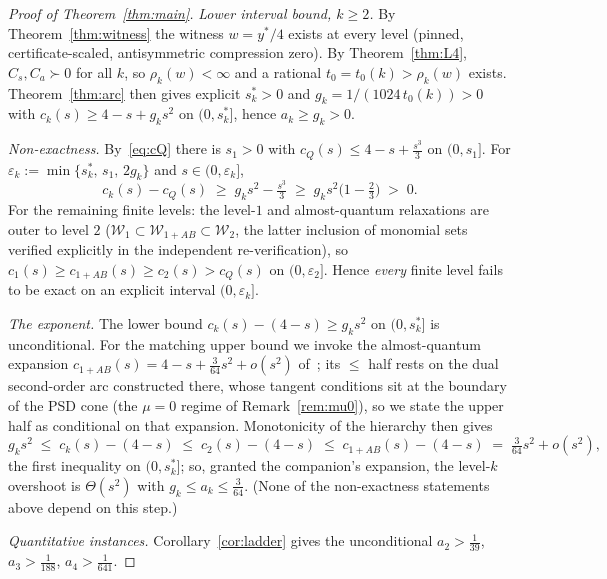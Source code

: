 \documentclass[11pt]{article}
\newcommand{\eps}{\varepsilon}
\begin{document}
\begin{proof}[Proof of Theorem~\ref{thm:main}]
\emph{Lower interval bound, $k\ge2$.} By Theorem~\ref{thm:witness} the
witness $w=y^\ast/4$ exists at every level (pinned, certificate-scaled,
antisymmetric compression zero). By Theorem~\ref{thm:L4}, $C_s,C_a\succ0$
for all $k$, so $\rho_k(w)<\infty$ and a rational $t_0=t_0(k)>\rho_k(w)$
exists. Theorem~\ref{thm:arc} then gives explicit $s^\ast_k>0$ and
$g_k=1/(1024\,t_0(k))>0$ with $c_k(s)\ge4-s+g_ks^2$ on $(0,s^\ast_k]$,
hence $a_k\ge g_k>0$.

\emph{Non-exactness.} By~\eqref{eq:cQ} there is $s_1>0$ with
$c_Q(s)\le4-s+\tfrac{s^3}3$ on $(0,s_1]$. For
$\eps_k:=\min\{s^\ast_k,\,s_1,\,2g_k\}$ and $s\in(0,\eps_k]$,
\[
c_k(s)-c_Q(s)\;\ge\;g_ks^2-\tfrac{s^3}3\;\ge\;g_ks^2\bigl(1-\tfrac23\bigr)
\;>\;0 .
\]
For the remaining finite levels: the level-$1$ and almost-quantum
relaxations are outer to level $2$
($\mathcal W_1\subset\mathcal W_{1+AB}\subset\mathcal W_2$, the latter
inclusion of monomial sets verified explicitly in the independent
re-verification), so
$c_1(s)\ge c_{1+AB}(s)\ge c_2(s)>c_Q(s)$ on $(0,\eps_2]$. Hence
\emph{every} finite level fails to be exact on an explicit interval
$(0,\eps_k]$.

\emph{The exponent.} The lower bound $c_k(s)-(4-s)\ge g_ks^2$ on
$(0,s^\ast_k]$ is unconditional. For the matching upper bound we invoke the
almost-quantum expansion $c_{1+AB}(s)=4-s+\tfrac3{64}s^2+o(s^2)$
of~\cite{overshoot}; its $\le$ half rests on the dual second-order arc
constructed there, whose tangent conditions sit at the boundary of the PSD
cone (the $\mu=0$ regime of Remark~\ref{rem:mu0}), so we state the upper
half as conditional on that expansion. Monotonicity of the hierarchy then
gives
\[
g_ks^2\;\le\;c_k(s)-(4-s)\;\le\;c_2(s)-(4-s)\;\le\;
c_{1+AB}(s)-(4-s)\;=\;\tfrac3{64}s^2+o(s^2),
\]
the first inequality on $(0,s^\ast_k]$; so, granted the companion's
expansion, the level-$k$ overshoot is $\Theta(s^2)$ with
$g_k\le a_k\le\tfrac3{64}$. (None of the non-exactness statements above
depend on this step.)

\emph{Quantitative instances.} Corollary~\ref{cor:ladder} gives the
unconditional $a_2>\tfrac1{39}$, $a_3>\tfrac1{188}$, $a_4>\tfrac1{641}$.
\end{proof}
\end{document}
